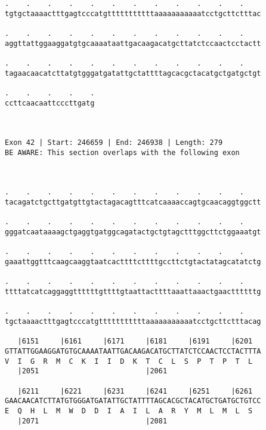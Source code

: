 \documentclass{article}
\begin{document}
\begin{Verbatim}
.    .    .    .    .    .    .    .    .    .    .    .    
tgtgctaaaactttgagtcccatgtttttttttttaaaaaaaaaaatcctgcttctttac
                                                            
.    .    .    .    .    .    .    .    .    .    .    .    
aggttattggaaggatgtgcaaaataattgacaagacatgcttatctccaactcctactt
                                                            
.    .    .    .    .    .    .    .    .    .    .    .    
tagaacaacatcttatgtgggatgatattgctattttagcacgctacatgctgatgctgt
                                                            
.    .    .    .    .
ccttcaacaattcccttgatg
                     
                     
 
Exon 42 | Start: 246659 | End: 246938 | Length: 279
BE AWARE: This section overlaps with the following exon



.    .    .    .    .    .    .    .    .    .    .    .    
tacagatctgcttgatgttgtactagacagtttcatcaaaaccagtgcaacaggtggctt
                                                            
.    .    .    .    .    .    .    .    .    .    .    .    
gggatcaataaaagctgaggtgatggcagatactgctgtagctttggcttctggaaatgt
                                                            
.    .    .    .    .    .    .    .    .    .    .    .    
gaaattggtttcaagcaaggtaatcacttttcttttgccttctgtactatagcatatctg
                                                            
.    .    .    .    .    .    .    .    .    .    .    .    
ttttatcatcaggaggttttttgttttgtaattacttttaaattaaactgaacttttttg
                                                            
.    .    .    .    .    .    .    .    .    .    .    .    
tgctaaaactttgagtcccatgtttttttttttaaaaaaaaaaatcctgcttctttacag
                                                            
   |6151     |6161     |6171     |6181     |6191     |6201  
GTTATTGGAAGGATGTGCAAAATAATTGACAAGACATGCTTATCTCCAACTCCTACTTTA
V  I  G  R  M  C  K  I  I  D  K  T  C  L  S  P  T  P  T  L  
   |2051                         |2061                      
  
   |6211     |6221     |6231     |6241     |6251     |6261  
GAACAACATCTTATGTGGGATGATATTGCTATTTTAGCACGCTACATGCTGATGCTGTCC
E  Q  H  L  M  W  D  D  I  A  I  L  A  R  Y  M  L  M  L  S  
   |2071                         |2081                      
  

\end{Verbatim}
\end{document}
